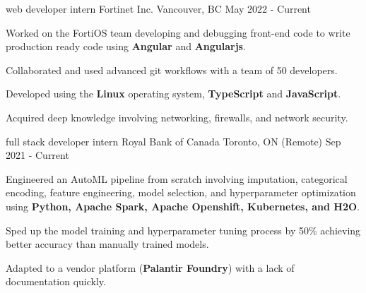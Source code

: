 

\begin{cventries}

  \cventry
    {web developer intern} %
    {Fortinet Inc.} %
    {Vancouver, BC} %
    {May 2022 - Current} %
    {
      \begin{cvitems} %
        \item {Worked on the FortiOS team developing and debugging front-end code to write production ready code using \textbf{Angular} and \textbf{Angularjs}.}        
        \item {Collaborated and used advanced git workflows with a team of 50 developers.}         
        \item {Developed using the \textbf{Linux} operating system, \textbf{TypeScript} and \textbf{JavaScript}.}    
        \item {Acquired deep knowledge involving networking, firewalls, and network security.}  
      \end{cvitems}
    } 

  \cventry
    {full stack developer intern} %
    {Royal Bank of Canada} %
    {Toronto, ON (Remote)} %
    {Sep 2021 - Current} %
    {
      \begin{cvitems} %
        \item {Engineered an AutoML pipeline from scratch involving imputation, categorical encoding, feature engineering, model selection, and hyperparameter optimization using \textbf{Python, Apache Spark, Apache Openshift, Kubernetes, and H2O}.}  
        \item {Sped up the model training and hyperparameter tuning process by 50\% achieving better accuracy than manually trained models.}    
        \item {Adapted to a vendor platform (\textbf{Palantir Foundry}) with a lack of documentation quickly.} 
      \end{cvitems}
    }


\end{cventries}
